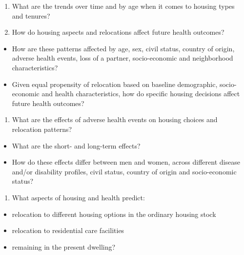 \documentclass[
]{book}
\providecommand{\tightlist}{%
  \setlength{\itemsep}{0pt}\setlength{\parskip}{0pt}}
\begin{document}
\begin{enumerate}
\def\labelenumi{\arabic{enumi}.}
\tightlist
\item
  What are the trends over time and by age when it comes to housing types and tenures?
\item
  How do housing aspects and relocations affect future health outcomes?
\end{enumerate}

\begin{itemize}
\tightlist
\item
  How are these patterns affected by age, sex, civil status, country of origin, adverse health
  events, loss of a partner, socio-economic and neighborhood characteristics?
\item
  Given equal propensity of relocation based on baseline demographic, socio-economic and
  health characteristics, how do specific housing decisions affect future health outcomes?
\end{itemize}

\begin{enumerate}
\def\labelenumi{\arabic{enumi}.}
\setcounter{enumi}{2}
\tightlist
\item
  What are the effects of adverse health events on housing choices and relocation patterns?
\end{enumerate}

\begin{itemize}
\tightlist
\item
  What are the short- and long-term effects?
\item
  How do these effects differ between men and women, across different disease and/or disability profiles, civil status, country of origin and socio-economic status?
\end{itemize}

\begin{enumerate}
\def\labelenumi{\arabic{enumi}.}
\setcounter{enumi}{3}
\tightlist
\item
  What aspects of housing and health predict:
\end{enumerate}

\begin{itemize}
\tightlist
\item
  relocation to different housing options in the ordinary housing stock
\item
  relocation to residential care facilities
\item
  remaining in the present dwelling?
\end{itemize}
\end{document}
